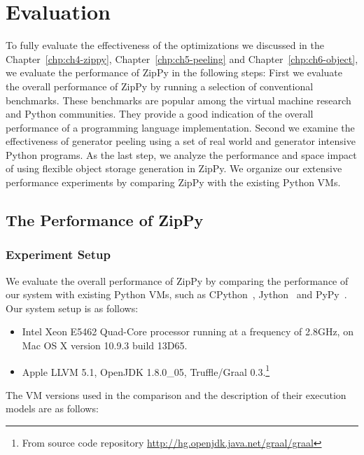 \chapter{Evaluation}
\label{chp:ch7-evaluation}

To fully evaluate the effectiveness of the optimizations we discussed in the Chapter~\ref{chp:ch4-zippy}, Chapter~\ref{chp:ch5-peeling} and Chapter~\ref{chp:ch6-object}, we evaluate the performance of ZipPy in the following steps:
First we evaluate the overall performance of ZipPy by running a selection of conventional benchmarks.
These benchmarks are popular among the virtual machine research and Python communities.
They provide a good indication of the overall performance of a programming language implementation.
Second we examine the effectiveness of generator peeling using a set of real world and generator intensive Python programs.
As the last step, we analyze the performance and space impact of using flexible object storage generation in ZipPy.
We organize our extensive performance experiments by comparing ZipPy with the existing Python VMs.

\section{The Performance of ZipPy}
\label{sec:ch6-performance-of-zippy}

\subsection{Experiment Setup}

We evaluate the overall performance of ZipPy by comparing the performance of our system with existing Python VMs, such as CPython~\cite{python}, Jython~\cite{jython} and PyPy~\cite{pypy}.
Our system setup is as follows:

\begin{itemize}

\item Intel Xeon E5462 Quad-Core processor running at a frequency of 2.8GHz, on Mac OS X version 10.9.3 build 13D65.

\item Apple LLVM 5.1, OpenJDK 1.8.0\_05, Truffle/Graal 0.3.\footnote{From source code repository \url{http://hg.openjdk.java.net/graal/graal}}

\end{itemize}

The VM versions used in the comparison and the description of their execution models are as follows:

